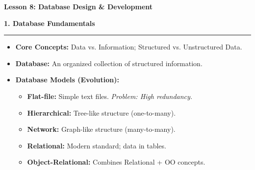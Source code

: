 \documentclass[a4paper, 8pt]{extarticle}
\newcommand{\sectionheading}[1]{\large\textbf{#1}\par\noindent\rule{\linewidth}{0.4pt}}
\begin{document}
\pagestyle{empty} %

\begin{center}
    \fontsize{12pt}{14pt}\selectfont
    \textbf{Lesson 8: Database Design \& Development}
\end{center}
\vspace{1em}

\begin{multicols}{2}


\sectionheading{1. Database Fundamentals}
\vspace{0.5em}
\begin{itemize}
    \item \textbf{Core Concepts:} Data vs. Information; Structured vs. Unstructured Data.
    \item \textbf{Database:} An organized collection of structured information.
    \item \textbf{Database Models (Evolution):}
    \begin{itemize}
        \item \textbf{Flat-file:} Simple text files. \textit{Problem: High redundancy.}
        \item \textbf{Hierarchical:} Tree-like structure (one-to-many).
        \item \textbf{Network:} Graph-like structure (many-to-many).
        \item \textbf{Relational:} Modern standard; data in tables.
        \item \textbf{Object-Relational:} Combines Relational + OO concepts.
    \end{itemize}
\end{itemize}


\end{multicols}
\end{document}
